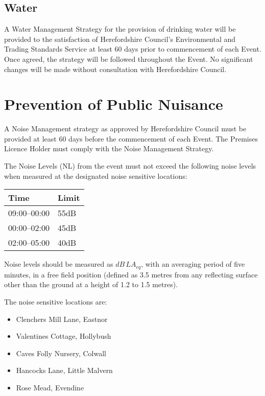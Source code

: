 \subsection{Water}\label{water}

A Water Management Strategy for the provision of drinking water will be
provided to the satisfaction of Herefordshire Council's Environmental
and Trading Standards Service at least 60 days prior to commencement of
each Event. Once agreed, the strategy will be followed throughout the
Event. No significant changes will be made without consultation with
Herefordshire Council.

\section{Prevention of Public Nuisance}\label{the-prevention-of-public-nuisance}
A Noise Management strategy as approved by Herefordshire Council must be
provided at least 60 days before the commencement of each Event. The
Premises Licence Holder must comply with the Noise Management Strategy.

The Noise Levels (NL) from the event must not exceed the following noise
levels when measured at the designated noise sensitive locations:

\begin{tabular}{l l}
  Time & Limit \\ \midrule
  09:00--00:00 & 55dB \\
  00:00--02:00 & 45dB \\
  02:00--05:00 & 40dB
\end{tabular}

Noise levels should be measured as $dB\, LA_{eq}$, with an averaging period of
five minutes, in a free field position (defined as 3.5 metres
from any reflecting surface other than the ground at a height of 1.2 to
1.5 metres).

The noise sensitive locations are:

  \begin{itemize}
  \tightlist
  \item
    Clenchers Mill Lane, Eastnor
  \item
    Valentines Cottage, Hollybush
  \item
    Caves Folly Nursery, Colwall
  \item
    Hancocks Lane, Little Malvern
  \item
    Rose Mead, Evendine
  \end{itemize}

